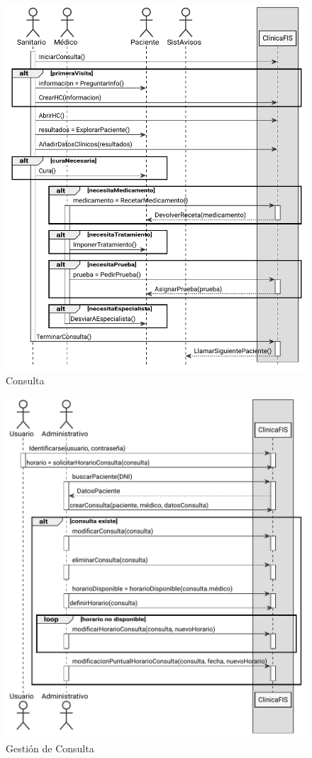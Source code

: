 \documentclass[11pt,a4paper]{article}
\begin{document}
\begin{figure}[H]
	\caption{Consulta}
	\centering
	\includegraphics{diagramas/pdf/diagramaConsulta.pdf}
\end{figure}

\begin{figure}[H]
	\caption{Gestión de Consulta}
	\centering
	\includegraphics{diagramas/pdf/diagramaGestionConsulta.pdf}
\end{figure}
\end{document}
